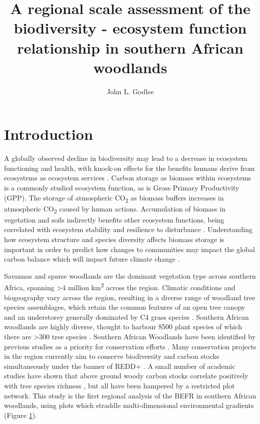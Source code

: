 \documentclass[11pt,a4paper]{article}
\title{A regional scale assessment of the biodiversity - ecosystem function relationship in southern African woodlands}
\author{John L. Godlee}
\date{}
\begin{document}
\maketitle
\tableofcontents

\section{Introduction}

A globally observed decline in biodiversity may lead to a decrease in ecosystem functioning and health, with knock-on effects for the benefits humans derive from ecosystems as ecosystem services \citep{}. Carbon storage as biomass within ecosystems is a commonly studied ecosystem function, as is Gross Primary Productivity (GPP). The storage of atmospheric CO\textsubscript{2} as biomass buffers increases in atmospheric CO\textsubscript{2} caused by human actions. Accumulation of biomass in vegetation and soils indirectly benefits other ecosystem functions, being correlated with ecosystem stability and resilience to disturbance \citep{}. Understanding how ecosystem structure and species diversity affects biomass storage is important in order to predict how changes to communities may impact the global carbon balance which will impact future climate change \citep{}.

Savannas and sparse woodlands are the dominant vegetation type across southern Africa, spanning \textgreater{}4 million km\textsuperscript{2} across the region. Climatic conditions and biogeography vary across the region, resulting in a diverse range of woodland tree species assemblages, which retain the common features of an open tree canopy and an understorey generally dominated by C4 grass species \citep{Frost1996}. Southern African woodlands are highly diverse, thought to harbour \textapprox{}8500 plant species of which there are \textgreater{}300 tree species \citep{Frost1996}. Southern African Woodlands have been identified by previous studies as a priority for conservation efforts \citep{Brooks2006, Mittermeier2003, Frost1996}. Many conservation projects in the region currently aim to conserve biodiversity and carbon stocks simultaneously under the banner of REDD+ \citep{Hinsley2015}. A small number of academic studies have shown that above ground woody carbon stocks correlate positively with tree species richness \citep{McNicol2017} , but all have been hampered by a restricted plot network. This study is the first regional analysis of the BEFR in southern African woodlands, using plots which straddle multi-dimensional environmental gradients (Figure \ref{}).
\end{document}
